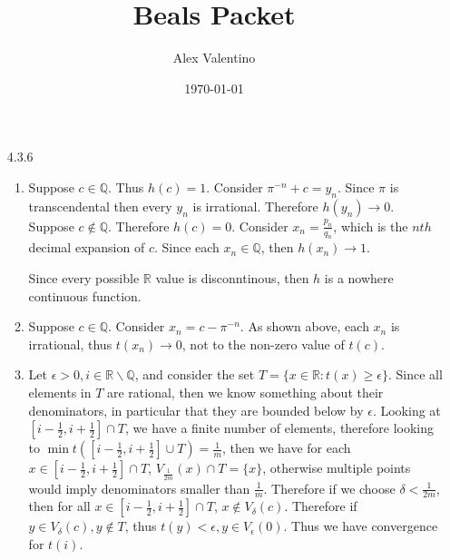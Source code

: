\documentclass[12pt, letterpaper]{article}
\date{\today}
\author{Alex Valentino}
\title{Beals Packet}
\newcommand{\R}{\mathbb{R}}
\newcommand{\Q}{\mathbb{Q}}
\begin{document}
\begin{enumerate}
	\item[4.3.6]
	\begin{enumerate}
		\item Suppose $c \in \Q$.  Thus $h(c) = 1$.  Consider $\pi^{-n} + c  = y_n$.  Since $\pi$ is transcendental then 
		every $y_n$ is irrational.  Therefore $h(y_n) \to 0$.\\
		
		Suppose $c \not \in \Q$.  Therefore $h(c) = 0$.  Consider $x_n = \frac{p_n}{q_n}$, which is the $nth$ decimal
		expansion of $c$.  Since each $x_n \in \Q$, then $h(x_n) \to 1$. 
		
		Since every possible $\R$ value is disconntinous, then $h$ is a nowhere continuous function.  
		\item Suppose $c \in \Q$.  Consider $x_n = c - \pi^{-n}$.  As shown above, each $x_n$ is irrational, thus $t(x_n) \to 0$, not to the non-zero value of $t(c)$.
		\item Let $\epsilon > 0, i \in \R \backslash \Q$, and consider the set $T = \{x \in \R: t(x) \geq \epsilon\}$.  Since all elements in $T$ are rational, then we know something about their denominators, in particular that they are bounded below by $\epsilon$.  Looking at $[i - \frac{1}{2}, i + \frac{1}{2}]\cap T$, we have a finite number of elements, therefore looking to $\min t([i - \frac{1}{2}, i + \frac{1}{2}]\cup T) = \frac{1}{m}$, then we have for each $x \in [i - \frac{1}{2}, i + \frac{1}{2}]\cap T$, $V_{\frac{1}{2m}}(x) \cap T = \{x\}$, otherwise multiple points would imply denominators smaller than $\frac{1}{m}$.  Therefore if we choose $\delta < \frac{1}{2m}$, then for all $x \in [i - \frac{1}{2}, i + \frac{1}{2}]\cap T$, $x \not \in V_\delta(c)$.  Therefore if $y \in V_\delta(c), y \not \in T$, thus 
		$t(y) < \epsilon, y \in V_\epsilon(0)$.  Thus we have convergence for $t(i)$. 
	\end{enumerate}
\end{enumerate}
\end{document}
